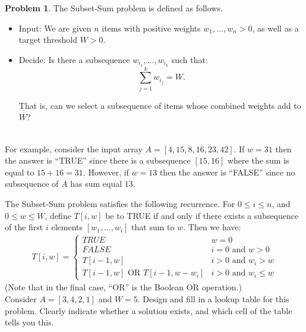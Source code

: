 \documentclass[11pt]{article}
\theoremstyle{definition}
\theoremstyle{definition}
\newtheorem{required}{Problem}
\theoremstyle{definition}
\begin{document}
\setcounter{required}{22}
\begin{required} 
The \textsf{Subset-Sum} problem is defined as follows.
\begin{itemize}
\item \textsf{Input:} We are given $n$ items with positive weights $w_{1}, \ldots, w_{n} > 0$, as well as a target threshold $W > 0$.  

\item \textsf{Decide:} Is there a subsequence $w_{i_{1}}, \ldots, w_{i_{k}}$ such that:
\[
\sum_{j=1}^{k} w_{i_{j}} = W.
\]

\noindent That is, can we select a subsequence of items whose combined weights add to $W$?
\end{itemize}

\noindent \\ For example, consider the input array $A = [4, 15, 8, 16, 23, 42].$
If $w = 31$ then the answer is ``TRUE'' since there is a subsequence $[15,16]$ where the sum is equal to $15 + 16 = 31$.
However, if $w = 13$ then the answer is ``FALSE'' since no subsequence of $A$ has sum equal $13$.

The \textsf{Subset-Sum} problem satisfies the following recurrence. For $0 \leq i \leq n$, and $0 \leq w \leq W$, define $T[i,w]$ be to TRUE if and only if there exists a subsequence of the first $i$ elements $[w_1,\dotsc,w_i]$ that sum to $w$. Then we have:
	\begin{align*}
	T[i, w] = 
	\begin{cases}
	TRUE & w=0\\
	FALSE & i = 0 \text{ and } w > 0\\
	T[i-1, w] & i > 0 \text{ and } w_{i} > w\\
	T[i-1, w] \text{ OR } T[i-1, w-w_{i}] & i > 0 \text{ and } w_i \leq w
	\end{cases}
	\end{align*}
(Note that in the final case, ``OR'' is the Boolean OR operation.) \\

\noindent Consider $A = [3,4,2,1]$ and $W = 5$. Design and fill in a lookup table for this problem. Clearly indicate whether a solution exists, and which cell of the table tells you this.

\end{required}
\end{document}

